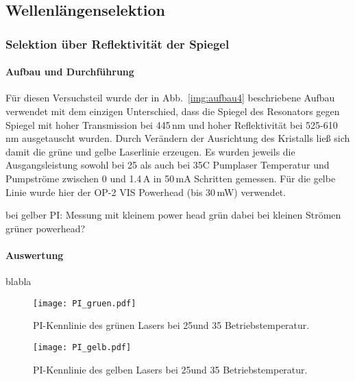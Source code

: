 \subsection{Wellenlängenselektion}

\subsubsection{Selektion über Reflektivität der Spiegel}

\paragraph{Aufbau und Durchführung}

Für diesen Versuchsteil wurde der in Abb.~\ref{img:aufbau4} beschriebene Aufbau verwendet mit dem einzigen Unterschied, dass die Spiegel des Resonators gegen Spiegel mit hoher Transmission bei 445\,nm und hoher Reflektivität bei 525-610\,nm ausgetauscht wurden.
Durch Verändern der Ausrichtung des Kristalls ließ sich damit die grüne und gelbe Laserlinie erzeugen. Es wurden jeweils die Ausgangsleistung sowohl bei 25 als auch bei 35\grad C Pumplaser Temperatur und Pumpströme zwischen 0 und 1.4\,A in 50\,mA Schritten gemessen.
Für die gelbe Linie wurde hier der OP-2 VIS Powerhead (bis 30\,mW) verwendet.





bei gelber PI:
Messung mit kleinem power head
grün dabei bei kleinen Strömen
grüner powerhead?

\paragraph{Auswertung}
blabla

\begin{figure}[H]
\begin{center}
  \texttt{[image: PI\_gruen.pdf]}
  \caption{PI-Kennlinie des grünen Lasers bei 25\grad und 35\grad
  Betriebstemperatur.}
  \label{img:PI_gruen}
\end{center}
\end{figure}


\begin{figure}[H]
\begin{center}
  \texttt{[image: PI\_gelb.pdf]}
  \caption{PI-Kennlinie des gelben Lasers bei 25\grad und 35\grad
  Betriebstemperatur.}
  \label{img:PI_gelb}
\end{center}
\end{figure}



